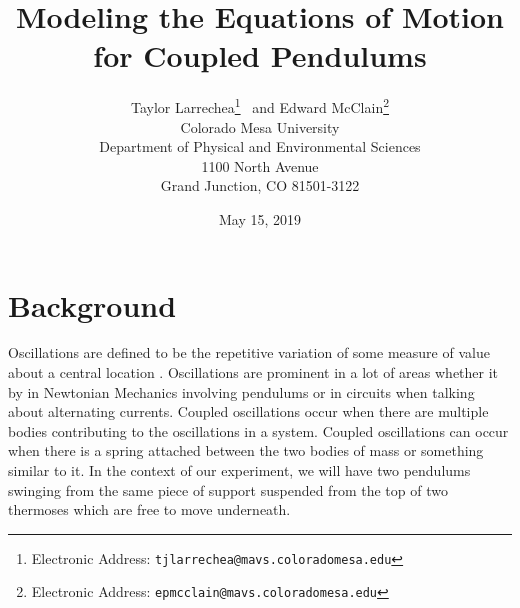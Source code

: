 \documentclass[twocolumn]{article}
\title{\textbf{Modeling the Equations of Motion for Coupled Pendulums}}
\author{Taylor Larrechea\footnote{Electronic Address: \texttt{tjlarrechea@mavs.coloradomesa.edu}} \ and Edward McClain\footnote{Electronic Address: \texttt{epmcclain@mavs.coloradomesa.edu}} \\
    Colorado Mesa University \\
    Department of Physical and Environmental Sciences \\
    1100 North Avenue \\
    Grand Junction, CO 81501-3122}
\date{May 15, 2019}
\begin{document}
\section*{Background}
Oscillations are defined to be the repetitive variation of some measure of value about a central location \cite{WikiOsc}. Oscillations are prominent in a lot of areas whether it by in Newtonian Mechanics involving pendulums or in circuits when talking about alternating currents. Coupled oscillations occur when there are multiple bodies contributing to the oscillations in a system. Coupled oscillations can occur when there is a spring attached between the two bodies of mass or something similar to it. In the context of our experiment, we will have two pendulums swinging from the same piece of support suspended from the top of two thermoses which are free to move underneath. 
\end{document}
